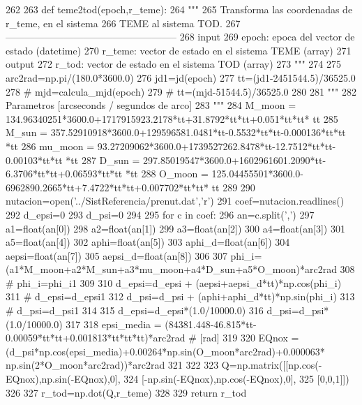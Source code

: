 \begin{DoxyCode}
262 
263 def teme2tod(epoch,r_teme):
264     """
265     Transforma las coordenadas de r_teme, en el sistema
266     TEME al sistema TOD.
267     -----------------------------------------------------
268     input
269         epoch: epoca del vector de estado (datetime)
270         r_teme: vector de estado en el sistema TEME (array)
271     output
272         r_tod: vector de estado en el sistema TOD (array)
273     """
274     
275     arc2rad=np.pi/(180.0*3600.0)   
276     jd1=jd(epoch)
277     tt=(jd1-2451544.5)/36525.0 
278 #     mjd=calcula_mjd(epoch)
279 #     tt=(mjd-51544.5)/36525.0
280 
281     """
282     Parametros [arcseconds / segundos de arco]
283     """
284     M_moon  = 134.96340251*3600.0+1717915923.2178*tt+31.8792*tt*tt+0.051*tt*tt*
      tt
285     M_sun   = 357.52910918*3600.0+129596581.0481*tt-0.5532*tt*tt-0.000136*tt*tt
      *tt
286     mu_moon = 93.27209062*3600.0+1739527262.8478*tt-12.7512*tt*tt-0.00103*tt*tt
      *tt
287     D_sun   = 297.85019547*3600.0+1602961601.2090*tt-6.3706*tt*tt+0.06593*tt*tt
      *tt
288     O_moon  = 125.04455501*3600.0-6962890.2665*tt+7.4722*tt*tt+0.007702*tt*tt*
      tt
289     
290     nutacion=open('../SistReferencia/prenut.dat','r')
291     coef=nutacion.readlines()
292     d_epsi=0
293     d_psi=0
294     
295     for c in coef:
296         an=c.split(',')
297         a1=float(an[0])
298         a2=float(an[1])
299         a3=float(an[2])
300         a4=float(an[3])
301         a5=float(an[4])
302         aphi=float(an[5])
303         aphi_d=float(an[6])
304         aepsi=float(an[7])
305         aepsi_d=float(an[8])
306         
307         phi_i=(a1*M_moon+a2*M_sun+a3*mu_moon+a4*D_sun+a5*O_moon)*arc2rad
308 #        phi_i=phi_i1%
309         
310         d_epsi=d_epsi + (aepsi+aepsi_d*tt)*np.cos(phi_i)
311 #        d_epsi=d_epsi1%
312         d_psi=d_psi + (aphi+aphi_d*tt)*np.sin(phi_i)
313 #        d_psi=d_psi1%
314 
315     d_epsi=d_epsi*(1.0/10000.0)
316     d_psi=d_psi*(1.0/10000.0)
317 
318     epsi_media = (84381.448-46.815*tt-0.00059*tt*tt+0.001813*tt*tt*tt)*arc2rad 
      # [rad]
319     
320     EQnox = (d_psi*np.cos(epsi_media)+0.00264*np.sin(O_moon*arc2rad)+0.000063*
      np.sin(2*O_moon*arc2rad))*arc2rad
321 
322     
323     Q=np.matrix([[np.cos(-EQnox),np.sin(-EQnox),0],
324                  [-np.sin(-EQnox),np.cos(-EQnox),0],
325                  [0,0,1]])
326     
327     r_tod=np.dot(Q,r_teme)
328     
329     return r_tod    
    
\end{DoxyCode}


